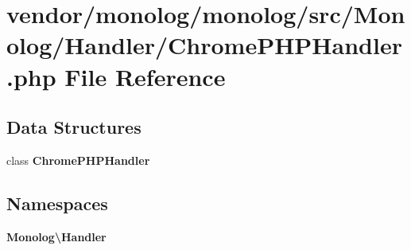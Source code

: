 \section{vendor/monolog/monolog/src/\+Monolog/\+Handler/\+Chrome\+P\+H\+P\+Handler.php File Reference}
\label{_chrome_p_h_p_handler_8php}
\subsection*{Data Structures}
\begin{DoxyCompactItemize}
\item 
class {\bf Chrome\+P\+H\+P\+Handler}
\end{DoxyCompactItemize}
\subsection*{Namespaces}
\begin{DoxyCompactItemize}
\item 
 {\bf Monolog\textbackslash{}\+Handler}
\end{DoxyCompactItemize}
